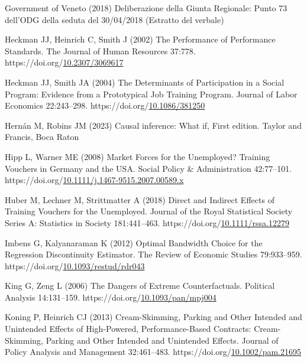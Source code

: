 \documentclass[
  11pt]{article}
\newlength{\cslhangindent}
\newenvironment{CSLReferences}[2] %
 {\begin{list}{}{%
  \setlength{\itemindent}{0pt}
  \setlength{\leftmargin}{0pt}
  \setlength{\parsep}{0pt}
  \ifodd #1
   \setlength{\leftmargin}{\cslhangindent}
   \setlength{\itemindent}{-1\cslhangindent}
  \fi
  \setlength{\itemsep}{#2\baselineskip}}}
 {\end{list}}
\begin{document}
\begin{CSLReferences}{1}{1}
Government of Veneto (2018) Deliberazione della {Giunta Regionale}:
{Punto} 73 dell'{ODG} della seduta del 30/04/2018 ({Estratto} del
verbale)

Heckman JJ, Heinrich C, Smith J (2002) The {Performance} of {Performance
Standards}. The Journal of Human Resources 37:778.
https://doi.org/\href{https://doi.org/10.2307/3069617}{10.2307/3069617}

Heckman JJ, Smith JA (2004) The {Determinants} of {Participation} in a
{Social Program}: {Evidence} from a {Prototypical Job Training Program}.
Journal of Labor Economics 22:243--298.
https://doi.org/\href{https://doi.org/10.1086/381250}{10.1086/381250}

Hernán M, Robins JM (2023) Causal inference: {What} if, First edition.
{Taylor and Francis}, Boca Raton

Hipp L, Warner ME (2008) Market {Forces} for the {Unemployed}? {Training
Vouchers} in {Germany} and the {USA}. Social Policy \& Administration
42:77--101.
https://doi.org/\href{https://doi.org/10.1111/j.1467-9515.2007.00589.x}{10.1111/j.1467-9515.2007.00589.x}

Huber M, Lechner M, Strittmatter A (2018) Direct and {Indirect Effects}
of {Training Vouchers} for the {Unemployed}. Journal of the Royal
Statistical Society Series A: Statistics in Society 181:441--463.
https://doi.org/\href{https://doi.org/10.1111/rssa.12279}{10.1111/rssa.12279}

Imbens G, Kalyanaraman K (2012) Optimal {Bandwidth Choice} for the
{Regression Discontinuity Estimator}. The Review of Economic Studies
79:933--959.
https://doi.org/\href{https://doi.org/10.1093/restud/rdr043}{10.1093/restud/rdr043}

King G, Zeng L (2006) The {Dangers} of {Extreme Counterfactuals}.
Political Analysis 14:131--159.
https://doi.org/\href{https://doi.org/10.1093/pan/mpj004}{10.1093/pan/mpj004}

Koning P, Heinrich CJ (2013) Cream-{Skimming}, {Parking} and {Other
Intended} and {Unintended Effects} of {High-Powered}, {Performance-Based
Contracts}: {Cream-Skimming}, {Parking} and {Other Intended} and
{Unintended Effects}. Journal of Policy Analysis and Management
32:461--483.
https://doi.org/\href{https://doi.org/10.1002/pam.21695}{10.1002/pam.21695}


\end{CSLReferences}
\end{document}
